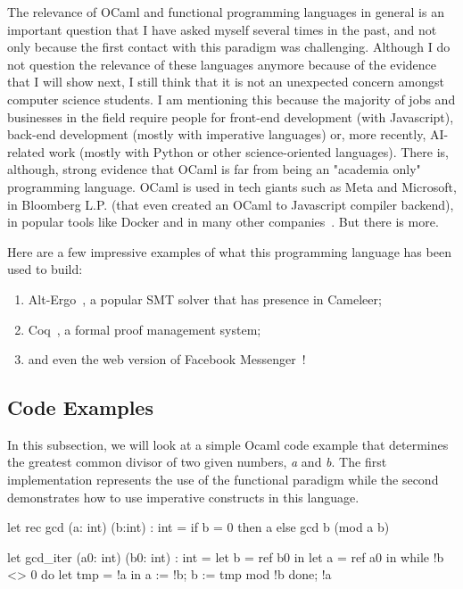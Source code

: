 The relevance of OCaml and functional programming languages in general is an important question that I have asked myself several times in the past, and not only because the first contact with this paradigm was challenging.
Although I do not question the relevance of these languages anymore because of the evidence that I will show next, I still think that it is not an unexpected concern amongst computer science students.
I am mentioning this because the majority of jobs and businesses in the field require people for front-end development (with Javascript), back-end development (mostly with imperative languages) or, more recently, AI-related work (mostly with Python or other science-oriented languages).
There is, although, strong evidence that OCaml is far from being an "academia only" programming language.
OCaml is used in tech giants such as Meta and Microsoft, in Bloomberg L.P. (that even created an OCaml to Javascript compiler backend), in popular tools like Docker and in many other companies~\cite{ocaml_companies}.
But there is more.

Here are a few impressive examples of what this programming language has been used to build: 
\begin{enumerate}
  \item Alt-Ergo~\cite{altergo}, a popular SMT solver that has presence in Cameleer;
  \item Coq~\cite{coq}, a formal proof management system;
  \item and even the web version of Facebook Messenger~\cite{messenger}!
\end{enumerate}

\subsection{Code Examples} 
\label{sub:examples_ocaml}

In this subsection, we will look at a simple Ocaml code example that determines the greatest common divisor of two given numbers, \emph{a} and \emph{b}.
The first implementation represents the use of the functional paradigm while the second demonstrates how to use imperative constructs in this language.

\begin{ocamlsmall}
  let rec gcd (a: int) (b:int) : int =
      if b = 0 then a
      else gcd b (mod a b) 
\end{ocamlsmall}

\begin{ocamlsmall}
  let gcd_iter (a0: int) (b0: int) : int =
      let b = ref b0 in
      let a = ref a0 in
      while !b <> 0 do
          let tmp = !a in
          a := !b;
          b := tmp mod !b
      done;
      !a
\end{ocamlsmall}

